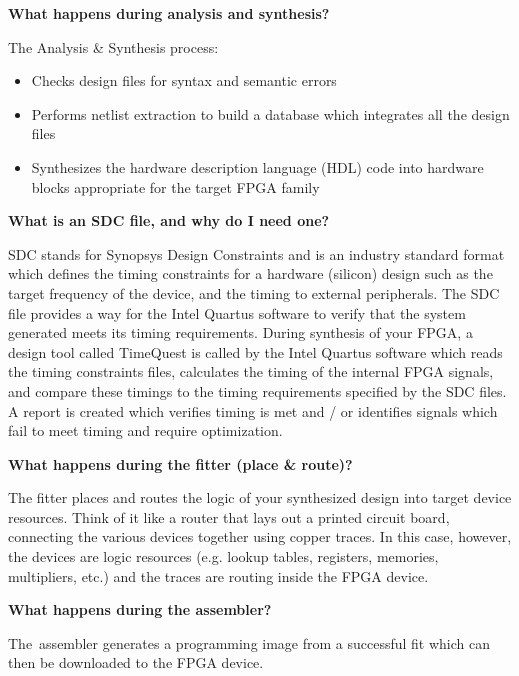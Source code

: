 \begin{flushleft}
\hypertarget{side2}{\textbf{What happens during analysis and synthesis?}}
\newline
The Analysis \& Synthesis process:

\begin{itemize}
\item Checks design files for syntax and semantic errors
\item Performs netlist extraction to build a database which integrates all the design files
\item Synthesizes the hardware description language (HDL) code into hardware blocks appropriate for the target FPGA family
\end{itemize}

\hypertarget{side3}{\textbf{What is an SDC file, and why do I need one?}}
\newline
SDC stands for Synopsys Design Constraints and is an industry standard format which defines the timing constraints for a hardware (silicon) design such as the target frequency of the device, and the timing to external peripherals. The SDC file provides a way for the Intel Quartus software to verify that the system generated meets its timing requirements.
\newline
\newline
During synthesis of your FPGA, a design tool called TimeQuest is called by the Intel Quartus software which reads the timing constraints files, calculates the timing of the internal FPGA signals, and compare these timings to the timing requirements specified by the SDC files. A report is created which verifies timing is met and / or identifies signals which fail to meet timing and require optimization.
\newline

\hypertarget{side4}{\textbf{What happens during the fitter (place \& route)?}}
\newline
The fitter places and routes the logic of your synthesized design into target device resources. Think of it like a router that lays out a printed circuit board, connecting the various devices together using copper traces. In this case, however, the devices are logic resources (e.g. lookup tables, registers, memories, multipliers, etc.) and the traces are routing  inside the FPGA device.
\newline

\hypertarget{side5}{\textbf{What happens during the assembler?}}
\newline
The~assembler generates a programming image from a successful fit which can then be downloaded to the FPGA device.
\newline


\end{flushleft}
